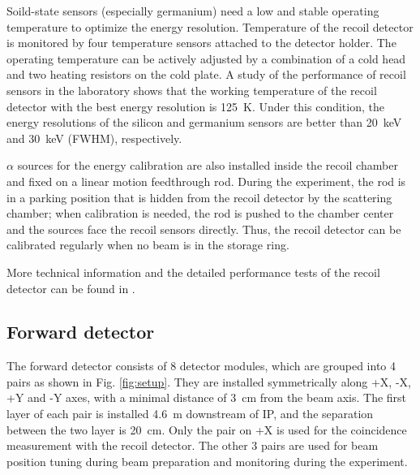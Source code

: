 \documentclass[number,5p]{elsarticle}
\begin{document}
Soild-state sensors (especially germanium) need a low and stable operating
temperature to optimize the energy resolution.
Temperature of the recoil detector is monitored by four temperature sensors
attached to the detector holder.
The operating temperature can be actively adjusted by a combination of a cold head and two heating resistors on the cold plate.
A study of the performance of recoil sensors in the laboratory shows that the
working temperature of the recoil detector with the best energy resolution is \SI{125}{\kelvin}.
Under this condition, the energy resolutions of the silicon and germanium
sensors are better than \SI{20}{\keV} and \SI{30}{\keV} (FWHM), respectively.

$\alpha$ sources for the energy calibration are also installed inside the recoil chamber and fixed on a linear motion feedthrough rod.
During the experiment, the rod is in a parking position that is hidden from the
recoil detector by the scattering chamber;
when calibration is needed, the rod is pushed to the chamber center and the sources face the recoil sensors directly.
Thus, the recoil detector can be calibrated regularly when no beam is in the
storage ring.

More technical information and the detailed performance tests of the recoil detector can be found in \cite{recoil_article}.

\subsection{Forward detector}
\label{sec:fwd}


The forward detector consists of 8 detector modules, which are
grouped into 4 pairs as shown in Fig. \ref{fig:setup}.
They are installed symmetrically along +X, -X, +Y and -Y axes, with a minimal distance of \SI{3}{\cm} from the beam axis.
The first layer of each pair is installed \SI{4.6}{\meter} downstream of IP, and the separation between the two layer is \SI{20}{\cm}.
Only the pair on +X is used for the coincidence measurement with the recoil detector.
The other 3 pairs are used for beam position tuning during beam preparation and
monitoring during the experiment.
\end{document}
